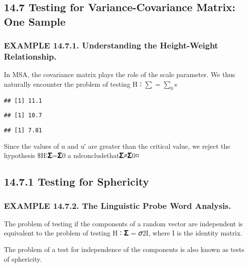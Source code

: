 \documentclass[]{article}
\begin{document}
\hypertarget{testing-for-variance-covariance-matrix-one-sample}{%
\subsection{14.7 Testing for Variance-Covariance Matrix: One
Sample}\label{testing-for-variance-covariance-matrix-one-sample}}

\hypertarget{example-14.7.1.-understanding-the-height-weight-relationship.}{%
\subsubsection{EXAMPLE 14.7.1. Understanding the Height-Weight
Relationship.}\label{example-14.7.1.-understanding-the-height-weight-relationship.}}

In MSA, the covariance matrix plays the role of the scale parameter. We
thus naturally encounter the problem of testing H ∶ \(\sum = \sum_0\)s

\begin{verbatim}
## [1] 11.1
\end{verbatim}

\begin{verbatim}
## [1] 10.7
\end{verbatim}

\begin{verbatim}
## [1] 7.81
\end{verbatim}

Since the values of u and u′ are greater than the critical value, we
reject the hypothesis \$H∶𝚺=𝚺0 a ndconcludethat𝚺≠𝚺0◽

\hypertarget{testing-for-sphericity}{%
\subsection{14.7.1 Testing for
Sphericity}\label{testing-for-sphericity}}

\hypertarget{example-14.7.2.-the-linguistic-probe-word-analysis.}{%
\subsubsection{EXAMPLE 14.7.2. The Linguistic Probe Word
Analysis.}\label{example-14.7.2.-the-linguistic-probe-word-analysis.}}

The problem of testing if the components of a random vector are
independent is equivalent to the problem of testing H ∶ 𝚺 = 𝜎2I, where I
is the identity matrix.

The problem of a test for independence of the components is also known
as tests of sphericity.
\end{document}

